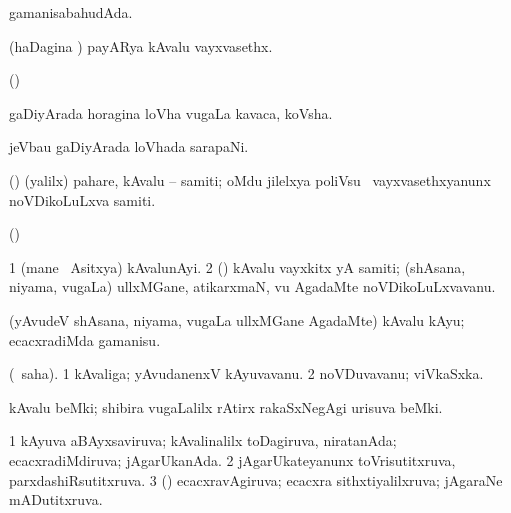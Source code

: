 {\bentry
{} 
\gl{\gu}
\expl{}
\bmng
gamanisabahudAda. 
\emng
\eentry

\bentry
{} 
\gl{\nA}
\expl{}
\bmng
(haDagina \vi) payARya kAvalu vayxvasethx. 
\emng
\eentry

\bentry
{} 
\gl{\nA}
\expl{}
\bmng
(\ame)  
\emng
\eentry

\bentry
{} 
\gl{\nA}
\expl{}
\bmng
gaDiyArada horagina loVha \mo vugaLa kavaca, koVsha. 
\emng
\eentry

\bentry
{} 
\gl{\nA}
\expl{}
\bmng
jeVbau gaDiyArada loVhada sarapaNi. 
\emng
\eentry

\bentry
{} 
\gl{\nA}
\expl{}
\bmng
(\ca) (\UK yalilx) pahare, kAvalu -- samiti; oMdu jilelxya poliVsu \mo\ vayxvasethxyanunx noVDikoLuLxva samiti. 
\emng
\eentry

\bentry
{} 
\gl{\nA}
\expl{}
\bmng
(\ame)  
\emng
\eentry

\bentry
{} 
\gl{\nA}
\expl{}
\bmng
\bnum
\num{1} (mane \mo\ Asitxya) kAvalunAyi. 
\num{2} (\rUpa) kAvalu vayxkitx yA samiti; (shAsana, niyama, \mo vugaLa) ullxMGane, atikarxmaN, \mo vu AgadaMte noVDikoLuLxvavanu. 
\enum
\emng
\eentry

\bentry
{} 
\gl{\sakirx}
\bmng
(yAvudeV shAsana, niyama, \mo vugaLa ullxMGane AgadaMte) kAvalu kAyu; ecacxradiMda gamanisu. 
\emng
\eentry

\bentry
{} 
\gl{\nA}
\expl{}
\bmng
(\saupa\ saha). 
\bnum
\num{1} kAvaliga; yAvudanenxV kAyuvavanu. 
\num{2} noVDuvavanu; viVkaSxka. 
\enum
\emng
\eentry

\bentry
{} 
\gl{\nA}
\expl{}
\bmng
kAvalu beMki; shibira \mo vugaLalilx rAtirx rakaSxNegAgi urisuva beMki. 
\emng
\eentry

\bentry
{} 
\gl{\gu}
\expl{}
\bmng
\bnum
\num{1} kAyuva aBAyxsaviruva; kAvalinalilx toDagiruva, niratanAda; ecacxradiMdiruva; jAgarUkanAda. 
\num{2} jAgarUkateyanunx toVrisutitxruva, parxdashiRsutitxruva. 
\num{3} (\pArxparx) ecacxravAgiruva; ecacxra sithxtiyalilxruva; jAgaraNe mADutitxruva. 
\enum
\emng
\eentry

}
